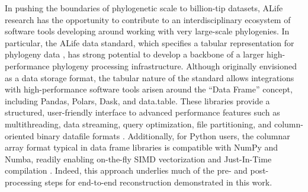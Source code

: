 In pushing the boundaries of phylogenetic scale to billion-tip datasets, ALife research has the opportunity to contribute to an interdisciplinary ecosystem of software tools developing around working with very large-scale phylogenies.
In particular, the ALife data standard, which specifies a tabular representation for phylogeny data \citep{lalejini2019data}, has strong potential to develop a backbone of a larger high-performance phylogeny processing infrastructure.
Although originally envisioned as a data storage format, the tabular nature of the standard allows integrations with high-performance software tools arisen around the ``Data Frame'' concept, including Pandas, Polars, Dask, and data.table.
These libraries provide a structured, user-friendly interface to advanced performance features such as multithreading, data streaming, query optimization, file partitioning, and column-oriented binary datafile formats \citep{mckinney2010data,barrett2025data,vink2024polars,rocklin2015dask}.
Additionally, for Python users, the columnar array format typical in data frame libraries is compatible with NumPy and Numba, readily enabling on-the-fly SIMD vectorization and Just-In-Time compilation \citep{harris2020array,lam2015numba}.
Indeed, this approach underlies much of the pre- and post-processing steps for end-to-end reconstruction demonstrated in this work.
